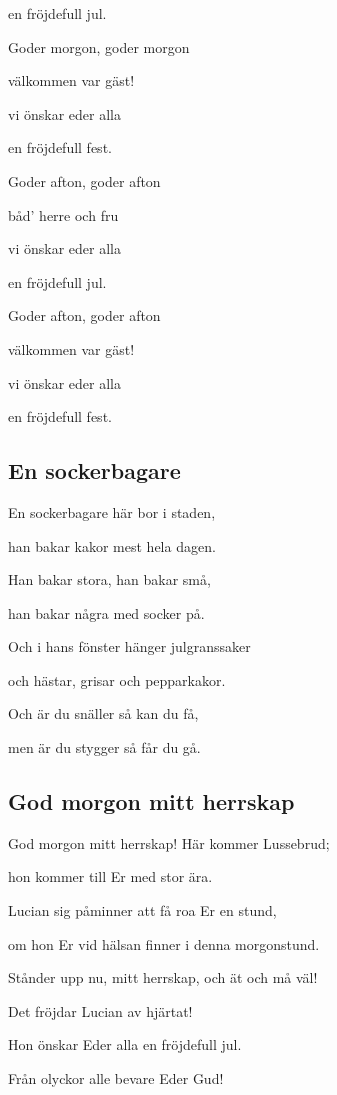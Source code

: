 en fröjdefull jul.\bigskip

Goder morgon, goder morgon

välkommen var gäst!

vi önskar eder alla

en fröjdefull fest.\bigskip

Goder afton, goder afton

båd’ herre och fru

vi önskar eder alla

en fröjdefull jul. \bigskip

Goder afton, goder afton

välkommen var gäst!

vi önskar eder alla

en fröjdefull fest.\bigskip

\subsection{\textbf{En sockerbagare}}

En sockerbagare här bor i staden,

han bakar kakor mest hela dagen.

Han bakar stora, han bakar små,

han bakar några med socker på. \bigskip

Och i hans fönster hänger julgranssaker

och hästar, grisar och pepparkakor.

Och är du snäller så kan du få,

men är du stygger så får du gå. \bigskip


\subsection{\textbf{God morgon mitt herrskap }}

God morgon mitt herrskap! Här kommer Lussebrud;

hon kommer till Er med stor ära.

Lucian sig påminner att få roa Er en stund,

om hon Er vid hälsan finner i denna morgonstund.

Stånder upp nu, mitt herrskap, och ät och må väl!

Det fröjdar Lucian av hjärtat!

Hon önskar Eder alla en fröjdefull jul.

Från olyckor alle bevare Eder Gud!

